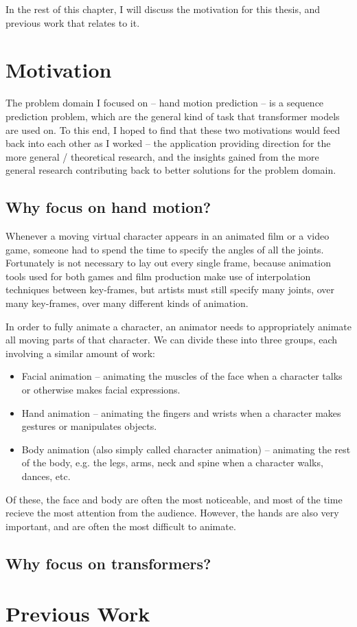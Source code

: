 In the rest of this chapter, I will discuss the motivation for this thesis, and previous work that relates to it.

\section{Motivation}
\label{s:motivation}
The problem domain I focused on -- hand motion prediction -- is a sequence prediction problem, which are  the general kind of task that transformer models are used on. To this end, I hoped to find that these two motivations would feed back into each other as I worked -- the application providing direction for the more general / theoretical research, and the insights gained from the more general research contributing back to better solutions for the problem domain.

\subsection{Why focus on hand motion?}
\label{ss:why-hand-motion}

Whenever a moving virtual character appears in an animated film or a video game, someone had to spend the time to specify the angles of all the joints. Fortunately is not necessary to lay out every single frame, because animation tools used for both games and film production make use of interpolation techniques between key-frames, but artists must still specify many joints, over many key-frames, over many different kinds of animation.

In order to fully animate a character, an animator needs to appropriately animate all moving parts of that character. We can divide these into three groups, each involving a similar amount of work:
\begin{itemize}
    \item Facial animation -- animating the muscles of the face when a character talks or otherwise makes facial expressions.
    \item Hand animation -- animating the fingers and wrists when a character makes gestures or manipulates objects.
    \item Body animation (also simply called character animation) -- animating the rest of the body, e.g. the legs, arms, neck and spine when a character walks, dances, etc.
\end{itemize}

Of these, the face and body are often the most noticeable, and most of the time recieve the most attention from the audience. However, the hands are also very important, and are often the most difficult to animate.


\subsection{Why focus on transformers?}
\label{ss:why-transformers}


\section{Previous Work}
